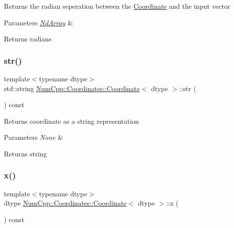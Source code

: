 Returns the radian seperation between the \mbox{\hyperlink{class_num_cpp_1_1_coordinates_1_1_coordinate}{Coordinate}} and the input vector


\begin{DoxyParams}{Parameters}
{\em \mbox{\hyperlink{class_num_cpp_1_1_nd_array}{Nd\+Array}}} & \\
\hline
\end{DoxyParams}
\begin{DoxyReturn}{Returns}
radians 
\end{DoxyReturn}
\mbox{\label{class_num_cpp_1_1_coordinates_1_1_coordinate_a415be42fdb49cb3e573a9492a15c88e0}} 
\subsubsection{\texorpdfstring{str()}{str()}}
{\footnotesize\ttfamily template$<$typename dtype$>$ \\
std\+::string \mbox{\hyperlink{class_num_cpp_1_1_coordinates_1_1_coordinate}{Num\+Cpp\+::\+Coordinates\+::\+Coordinate}}$<$ dtype $>$\+::str (\begin{DoxyParamCaption}{ }\end{DoxyParamCaption}) const\hspace{0.3cm}{\ttfamily [inline]}}

Returns coordinate as a string representation


\begin{DoxyParams}{Parameters}
{\em None} & \\
\hline
\end{DoxyParams}
\begin{DoxyReturn}{Returns}
string 
\end{DoxyReturn}
\mbox{\label{class_num_cpp_1_1_coordinates_1_1_coordinate_a6f50cd856484c4a08e376970c58820b4}} 
\subsubsection{\texorpdfstring{x()}{x()}}
{\footnotesize\ttfamily template$<$typename dtype$>$ \\
dtype \mbox{\hyperlink{class_num_cpp_1_1_coordinates_1_1_coordinate}{Num\+Cpp\+::\+Coordinates\+::\+Coordinate}}$<$ dtype $>$\+::x (\begin{DoxyParamCaption}{ }\end{DoxyParamCaption}) const\hspace{0.3cm}{\ttfamily [inline]}}

